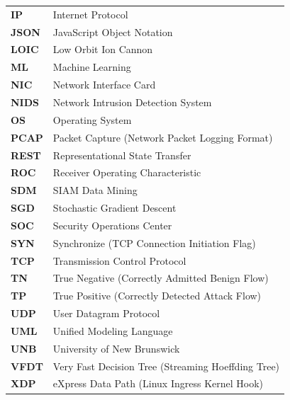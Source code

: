 \documentclass[12pt,a4paper,oneside]{report}
\begin{document}
\begin{table}[h]
\begin{tabularx}{\textwidth}{l X}
\textbf{IP}        & Internet Protocol \\
\textbf{JSON}      & JavaScript Object Notation \\
\textbf{LOIC}      & Low Orbit Ion Cannon \\
\textbf{ML}        & Machine Learning \\
\textbf{NIC}       & Network Interface Card \\
\textbf{NIDS}      & Network Intrusion Detection System \\
\textbf{OS}        & Operating System \\
\textbf{PCAP}      & Packet Capture (Network Packet Logging Format) \\
\textbf{REST}      & Representational State Transfer \\
\textbf{ROC}       & Receiver Operating Characteristic \\
\textbf{SDM}       & SIAM Data Mining \\
\textbf{SGD}       & Stochastic Gradient Descent \\
\textbf{SOC}       & Security Operations Center \\
\textbf{SYN}       & Synchronize (TCP Connection Initiation Flag) \\
\textbf{TCP}       & Transmission Control Protocol \\
\textbf{TN}        & True Negative (Correctly Admitted Benign Flow) \\
\textbf{TP}        & True Positive (Correctly Detected Attack Flow) \\
\textbf{UDP}       & User Datagram Protocol \\
\textbf{UML}       & Unified Modeling Language \\
\textbf{UNB}       & University of New Brunswick \\
\textbf{VFDT}      & Very Fast Decision Tree (Streaming Hoeffding Tree) \\
\textbf{XDP}       & eXpress Data Path (Linux Ingress Kernel Hook) \\
\bottomrule
\end{tabularx}
\end{table}

\newpage
{}

\end{document}
